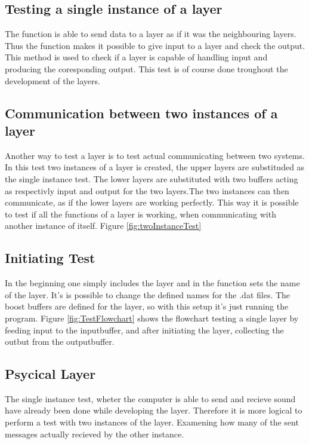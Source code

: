 \subsection{Testing a single instance of a layer}  

 The function is able to send data to a layer as if it was the neighbouring layers. Thus the function makes it possible to give input to a layer and check the output. This method is used to check if a layer is capable of  handling input and producing the coresponding output. This test is of course done troughout the development of the layers.


\subsection{Communication between two instances of a layer}

Another way to test a layer is to test actual communicating between two systems. In this test two instances of a layer is created, the upper layers are substituded as the single instance test. The lower layers are substituted with two buffers acting as respectivly  input and output for the two layers.The two instances can then communicate, as if the lower layers are working perfectly. This way it is possible to test if all the functions of a layer is working, when communicating with another instance of itself.
Figure \ref{fig:twoInstanceTest}


\subsection{Initiating Test}
In the beginning one simply includes the layer and in the function sets the name of the layer. It's is possible to change the defined names for the .dat files. The boost buffers are defined for the layer, so with this setup it's just running the program.
Figure \ref{fig:TestFlowchart} shows the flowchart testing a single layer by feeding input to the inputbuffer, and after initiating the layer, collecting the outbut from the outputbuffer.

\subsection{Psycical Layer}

The single instance test, wheter the computer is able to send and recieve sound have already been done while developing the layer. Therefore it is more logical to perform a test with two instances of the layer. Examening how many of the sent messages actually recieved by the other instance.

